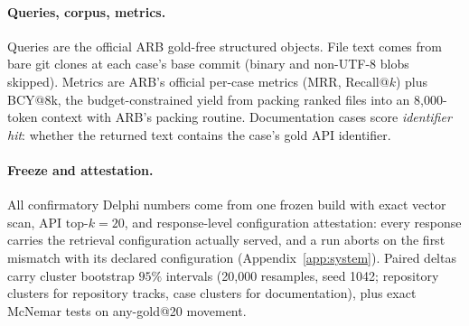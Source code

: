 \documentclass{article}
\newcommand{\system}{Delphi}
\begin{document}
\paragraph{Queries, corpus, metrics.} Queries are the official ARB gold-free structured objects. File text comes from bare git clones at each case's base commit (binary and non-UTF-8 blobs skipped). Metrics are ARB's official per-case metrics (MRR, Recall@$k$) plus BCY@8k, the budget-constrained yield from packing ranked files into an 8{,}000-token context with ARB's packing routine. Documentation cases score \emph{identifier hit}: whether the returned text contains the case's gold API identifier.

\paragraph{Freeze and attestation.} All confirmatory \system{} numbers come from one frozen build with exact vector scan, API $\text{top-}k{=}20$, and response-level configuration attestation: every response carries the retrieval configuration actually served, and a run aborts on the first mismatch with its declared configuration (Appendix~\ref{app:system}). Paired deltas carry cluster bootstrap $95\%$ intervals (20{,}000 resamples, seed 1042; repository clusters for repository tracks, case clusters for documentation), plus exact McNemar tests on any-gold@20 movement.
\end{document}
